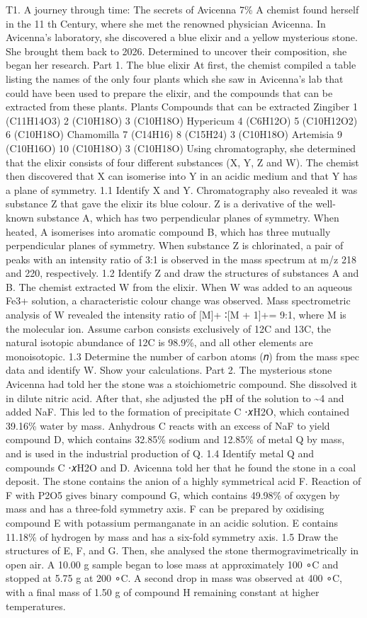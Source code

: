 T1. A journey through time: The secrets of Avicenna 7\% A chemist found herself in the 11 th Century, where she met the renowned physician Avicenna. In Avicenna's laboratory, she discovered a blue elixir and a yellow mysterious stone. She brought them back to 2026. Determined to uncover their composition, she began her research. Part 1. The blue elixir At first, the chemist compiled a table listing the names of the only four plants which she saw in Avicenna’s lab that could have been used to prepare the elixir, and the compounds that can be extracted from these plants. Plants Compounds that can be extracted Zingiber 1 (C11H14O3) 2 (C10H18O) 3 (C10H18O) Hypericum 4 (C6H12O) 5 (C10H12O2) 6 (C10H18O) Chamomilla 7 (C14H16) 8 (C15H24) 3 (C10H18O) Artemisia 9 (C10H16O) 10 (C10H18O) 3 (C10H18O) Using chromatography, she determined that the elixir consists of four different substances (X, Y, Z and W). The chemist then discovered that X can isomerise into Y in an acidic medium and that Y has a plane of symmetry. 1.1 Identify X and Y. Chromatography also revealed it was substance Z that gave the elixir its blue colour. Z is a derivative of the well-known substance A, which has two perpendicular planes of symmetry. When heated, A isomerises into aromatic compound B, which has three mutually perpendicular planes of symmetry. When substance Z is chlorinated, a pair of peaks with an intensity ratio of 3:1 is observed in the mass spectrum at m/z 218 and 220, respectively. 1.2 Identify Z and draw the structures of substances A and B. The chemist extracted W from the elixir. When W was added to an aqueous Fe3+ solution, a characteristic colour change was observed. Mass spectrometric analysis of W revealed the intensity ratio of [M]+ ∶[M + 1]+= 9:1, where M is the molecular ion. Assume carbon consists exclusively of 12C and 13C, the natural isotopic abundance of 12C is 98.9\%, and all other elements are monoisotopic. 1.3 Determine the number of carbon atoms (𝑛) from the mass spec data and identify W. Show your calculations. Part 2. The mysterious stone Avicenna had told her the stone was a stoichiometric compound. She dissolved it in dilute nitric acid. After that, she adjusted the pH of the solution to \textasciitilde{}4 and added NaF. This led to the formation of precipitate C ⋅𝑥H2O, which contained 39.16\% water by mass. Anhydrous C reacts with an excess of NaF to yield compound D, which contains 32.85\% sodium and 12.85\% of metal Q by mass, and is used in the industrial production of Q. 1.4 Identify metal Q and compounds C ⋅𝑥H2O and D. Avicenna told her that he found the stone in a coal deposit. The stone contains the anion of a highly symmetrical acid F. Reaction of F with P2O5 gives binary compound G, which contains 49.98\% of oxygen by mass and has a three-fold symmetry axis. F can be prepared by oxidising compound E with potassium permanganate in an acidic solution. E contains 11.18\% of hydrogen by mass and has a six-fold symmetry axis. 1.5 Draw the structures of E, F, and G. Then, she analysed the stone thermogravimetrically in open air. A 10.00 g sample began to lose mass at approximately 100 ∘C and stopped at 5.75 g at 200 ∘C. A second drop in mass was observed at 400 ∘C, with a final mass of 1.50 g of compound H remaining constant at higher temperatures.

